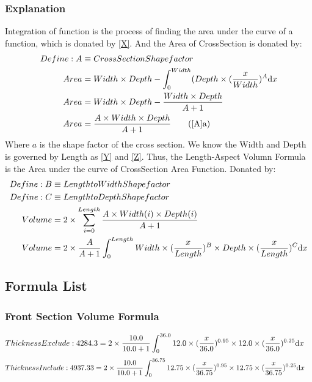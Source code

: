 \documentclass{article}%
\begin{document}
\subsubsection{Explanation}%
\label{ssubsec:Explanation}%
Integration of function is the process of finding the area under the curve of a function, which is donated by \eqref{X}. %
And the Area of CrossSection is donated by:%
\begin{align}%
Define:A &\equiv CrossSection Shape factor\notag\\%
Area &=Width\times Depth - \int_0^{Width} (Depth\times(\frac{x}{Width})^{A} \mathrm{d}x\label{A}\\%
Area &=Width\times Depth - \frac{Width\times Depth}{A + 1}\notag\\%
Area &=\frac{A\times Width\times Depth}{A + 1}\tag{\ref{A}{a}}%
\end{align}%
Where $a$ is the shape factor of the cross section.%
We know the Width and Depth is governed by Length as \eqref{Y} and \eqref{Z}.%
Thus, the Length{-}Aspect Volumn Formula is the Area under the curve of CrossSection Area Function. Donated by: %
\begin{align}%
Define: B &\equiv Length to Width Shape factor\notag\\%
Define: C &\equiv Length to Depth Shape factor\notag\\%
Volume &=2\times \displaystyle\sum_{i=0}^{Length} \frac{A\times Width(i) \times Depth(i)}{A+1}\notag\\%
Volume &=2\times \frac{A}{A+1} \int_0^{Length} Width\times(\frac{x}{Length})^{B}\times Depth\times(\frac{x}{Length})^{C} \mathrm{d}x\label{B}%
\end{align}

%
\subsection{Formula List}%
\label{subsec:FormulaList}%
\subsubsection{Front Section Volume Formula}%
\label{ssubsec:FrontSectionVolumeFormula}%
\begin{align}%
Thickness Exclude: 4284.3 &=2\times \frac{10.0}{10.0+1} \int_0^{36.0} 12.0\times(\frac{x}{36.0})^{0.95}\times 12.0\times(\frac{x}{36.0})^{0.25} \mathrm{d}x \notag%
\end{align}%
\begin{align}%
Thickness Include: 4937.33 &=2\times \frac{10.0}{10.0+1} \int_0^{36.75} 12.75\times(\frac{x}{36.75})^{0.95}\times 12.75\times(\frac{x}{36.75})^{0.25} \mathrm{d}x \notag%
\end{align}
\end{document}

